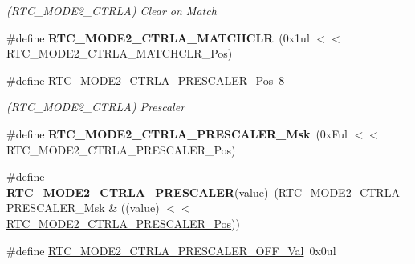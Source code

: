 \begin{DoxyCompactItemize}
\begin{DoxyCompactList}\small\item\em (R\+T\+C\+\_\+\+M\+O\+D\+E2\+\_\+\+C\+T\+R\+L\+A) Clear on Match \end{DoxyCompactList}\item 
\hypertarget{group___s_a_m_l21___r_t_c_ga0725e3154b7494bd1d13c4f4da0d917e}{}\#define {\bfseries R\+T\+C\+\_\+\+M\+O\+D\+E2\+\_\+\+C\+T\+R\+L\+A\+\_\+\+M\+A\+T\+C\+H\+C\+L\+R}~(0x1ul $<$$<$ R\+T\+C\+\_\+\+M\+O\+D\+E2\+\_\+\+C\+T\+R\+L\+A\+\_\+\+M\+A\+T\+C\+H\+C\+L\+R\+\_\+\+Pos)\label{group___s_a_m_l21___r_t_c_ga0725e3154b7494bd1d13c4f4da0d917e}

\item 
\hypertarget{group___s_a_m_l21___r_t_c_ga8ceb43a4478f656d6288fabd99a094fb}{}\#define \hyperlink{group___s_a_m_l21___r_t_c_ga8ceb43a4478f656d6288fabd99a094fb}{R\+T\+C\+\_\+\+M\+O\+D\+E2\+\_\+\+C\+T\+R\+L\+A\+\_\+\+P\+R\+E\+S\+C\+A\+L\+E\+R\+\_\+\+Pos}~8\label{group___s_a_m_l21___r_t_c_ga8ceb43a4478f656d6288fabd99a094fb}

\begin{DoxyCompactList}\small\item\em (R\+T\+C\+\_\+\+M\+O\+D\+E2\+\_\+\+C\+T\+R\+L\+A) Prescaler \end{DoxyCompactList}\item 
\hypertarget{group___s_a_m_l21___r_t_c_ga89eb17aa17c957df0bffd57be27e8212}{}\#define {\bfseries R\+T\+C\+\_\+\+M\+O\+D\+E2\+\_\+\+C\+T\+R\+L\+A\+\_\+\+P\+R\+E\+S\+C\+A\+L\+E\+R\+\_\+\+Msk}~(0x\+Ful $<$$<$ R\+T\+C\+\_\+\+M\+O\+D\+E2\+\_\+\+C\+T\+R\+L\+A\+\_\+\+P\+R\+E\+S\+C\+A\+L\+E\+R\+\_\+\+Pos)\label{group___s_a_m_l21___r_t_c_ga89eb17aa17c957df0bffd57be27e8212}

\item 
\hypertarget{group___s_a_m_l21___r_t_c_gac71494f852fc3b8846ce6a834bd9b517}{}\#define {\bfseries R\+T\+C\+\_\+\+M\+O\+D\+E2\+\_\+\+C\+T\+R\+L\+A\+\_\+\+P\+R\+E\+S\+C\+A\+L\+E\+R}(value)~(R\+T\+C\+\_\+\+M\+O\+D\+E2\+\_\+\+C\+T\+R\+L\+A\+\_\+\+P\+R\+E\+S\+C\+A\+L\+E\+R\+\_\+\+Msk \& ((value) $<$$<$ \hyperlink{group___s_a_m_l21___r_t_c_ga8ceb43a4478f656d6288fabd99a094fb}{R\+T\+C\+\_\+\+M\+O\+D\+E2\+\_\+\+C\+T\+R\+L\+A\+\_\+\+P\+R\+E\+S\+C\+A\+L\+E\+R\+\_\+\+Pos}))\label{group___s_a_m_l21___r_t_c_gac71494f852fc3b8846ce6a834bd9b517}

\item 
\hypertarget{group___s_a_m_l21___r_t_c_gaf4d699218ec1c0cc55b9f43f64344ab7}{}\#define \hyperlink{group___s_a_m_l21___r_t_c_gaf4d699218ec1c0cc55b9f43f64344ab7}{R\+T\+C\+\_\+\+M\+O\+D\+E2\+\_\+\+C\+T\+R\+L\+A\+\_\+\+P\+R\+E\+S\+C\+A\+L\+E\+R\+\_\+\+O\+F\+F\+\_\+\+Val}~0x0ul\label{group___s_a_m_l21___r_t_c_gaf4d699218ec1c0cc55b9f43f64344ab7}


\end{DoxyCompactItemize}
